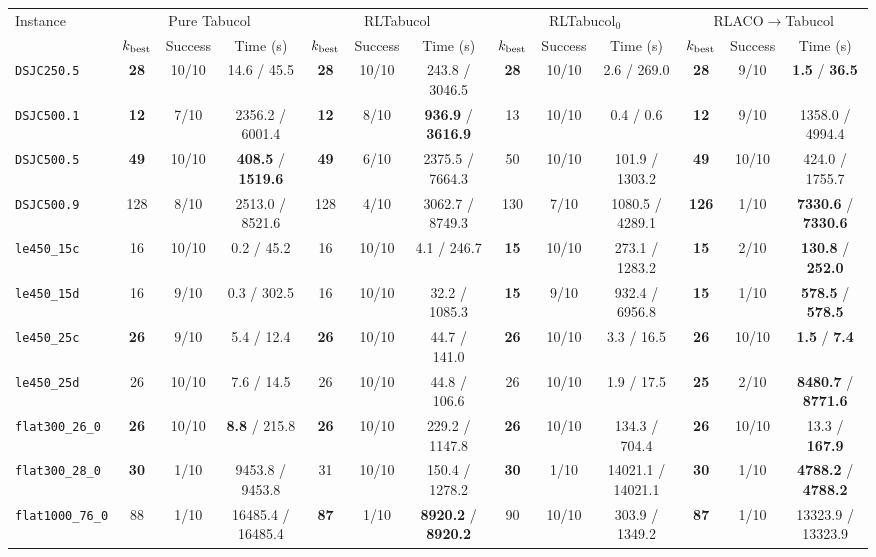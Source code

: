 \begin{tabular}{@{}lcccccccccccc@{}}
\toprule
Instance & \multicolumn{3}{c}{Pure Tabucol} & \multicolumn{3}{c}{RLTabucol} & \multicolumn{3}{c}{RLTabucol$_0$} & \multicolumn{3}{c}{RLACO$\rightarrow$Tabucol}\\
 & $k_{\rm best}$ & Success & Time (s) & $k_{\rm best}$ & Success & Time (s) & $k_{\rm best}$ & Success & Time (s) & $k_{\rm best}$ & Success & Time (s)\\
\midrule
\texttt{DSJC250.5} & \textbf{28} & 10/10 & 14.6 / 45.5 & \textbf{28} & 10/10 & 243.8 / 3046.5 & \textbf{28} & 10/10 & 2.6 / 269.0 & \textbf{28} & 9/10 & \textbf{1.5} / \textbf{36.5} \\
\texttt{DSJC500.1} & \textbf{12} & 7/10 & 2356.2 / 6001.4 & \textbf{12} & 8/10 & \textbf{936.9} / \textbf{3616.9} & 13 & 10/10 & 0.4 / 0.6 & \textbf{12} & 9/10 & 1358.0 / 4994.4 \\
\texttt{DSJC500.5} & \textbf{49} & 10/10 & \textbf{408.5} / \textbf{1519.6} & \textbf{49} & 6/10 & 2375.5 / 7664.3 & 50 & 10/10 & 101.9 / 1303.2 & \textbf{49} & 10/10 & 424.0 / 1755.7 \\
\texttt{DSJC500.9} & 128 & 8/10 & 2513.0 / 8521.6 & 128 & 4/10 & 3062.7 / 8749.3 & 130 & 7/10 & 1080.5 / 4289.1 & \textbf{126} & 1/10 & \textbf{7330.6} / \textbf{7330.6} \\
\texttt{le450\_15c} & 16 & 10/10 & 0.2 / 45.2 & 16 & 10/10 & 4.1 / 246.7 & \textbf{15} & 10/10 & 273.1 / 1283.2 & \textbf{15} & 2/10 & \textbf{130.8} / \textbf{252.0} \\
\texttt{le450\_15d} & 16 & 9/10 & 0.3 / 302.5 & 16 & 10/10 & 32.2 / 1085.3 & \textbf{15} & 9/10 & 932.4 / 6956.8 & \textbf{15} & 1/10 & \textbf{578.5} / \textbf{578.5} \\
\texttt{le450\_25c} & \textbf{26} & 9/10 & 5.4 / 12.4 & \textbf{26} & 10/10 & 44.7 / 141.0 & \textbf{26} & 10/10 & 3.3 / 16.5 & \textbf{26} & 10/10 & \textbf{1.5} / \textbf{7.4} \\
\texttt{le450\_25d} & 26 & 10/10 & 7.6 / 14.5 & 26 & 10/10 & 44.8 / 106.6 & 26 & 10/10 & 1.9 / 17.5 & \textbf{25} & 2/10 & \textbf{8480.7} / \textbf{8771.6} \\
\texttt{flat300\_26\_0} & \textbf{26} & 10/10 & \textbf{8.8} / 215.8 & \textbf{26} & 10/10 & 229.2 / 1147.8 & \textbf{26} & 10/10 & 134.3 / 704.4 & \textbf{26} & 10/10 & 13.3 / \textbf{167.9} \\
\texttt{flat300\_28\_0} & \textbf{30} & 1/10 & 9453.8 / 9453.8 & 31 & 10/10 & 150.4 / 1278.2 & \textbf{30} & 1/10 & 14021.1 / 14021.1 & \textbf{30} & 1/10 & \textbf{4788.2} / \textbf{4788.2} \\
\texttt{flat1000\_76\_0} & 88 & 1/10 & 16485.4 / 16485.4 & \textbf{87} & 1/10 & \textbf{8920.2} / \textbf{8920.2} & 90 & 10/10 & 303.9 / 1349.2 & \textbf{87} & 1/10 & 13323.9 / 13323.9 \\
\bottomrule
\end{tabular}
